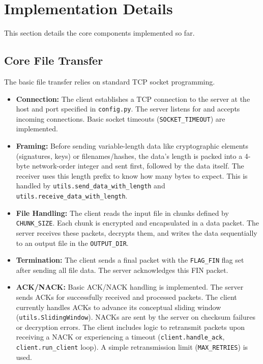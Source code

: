 \documentclass[11pt]{article}
\begin{document}
\section{Implementation Details}
\label{sec:implementation}
This section details the core components implemented so far.

\subsection{Core File Transfer}
\label{sec:core_transfer}
The basic file transfer relies on standard TCP socket programming.
\begin{itemize}
    \item \textbf{Connection:} The client establishes a TCP connection to the server at the host and port specified in \texttt{config.py}. The server listens for and accepts incoming connections. Basic socket timeouts (\texttt{SOCKET\_TIMEOUT}) are implemented.
    \item \textbf{Framing:} Before sending variable-length data like cryptographic elements (signatures, keys) or filenames/hashes, the data's length is packed into a 4-byte network-order integer and sent first, followed by the data itself. The receiver uses this length prefix to know how many bytes to expect. This is handled by \texttt{utils.send\_data\_with\_length} and \texttt{utils.receive\_data\_with\_length}.
    \item \textbf{File Handling:} The client reads the input file in chunks defined by \texttt{CHUNK\_SIZE}. Each chunk is encrypted and encapsulated in a data packet. The server receives these packets, decrypts them, and writes the data sequentially to an output file in the \texttt{OUTPUT\_DIR}.
    \item \textbf{Termination:} The client sends a final packet with the \texttt{FLAG\_FIN} flag set after sending all file data. The server acknowledges this FIN packet.
    \item \textbf{ACK/NACK:} Basic ACK/NACK handling is implemented. The server sends ACKs for successfully received and processed packets. The client currently handles ACKs to advance its conceptual sliding window (\texttt{utils.SlidingWindow}). NACKs are sent by the server on checksum failures or decryption errors. The client includes logic to retransmit packets upon receiving a NACK or experiencing a timeout (\texttt{client.handle\_ack}, \texttt{client.run\_client} loop). A simple retransmission limit (\texttt{MAX\_RETRIES}) is used.
\end{itemize}
\end{document}
